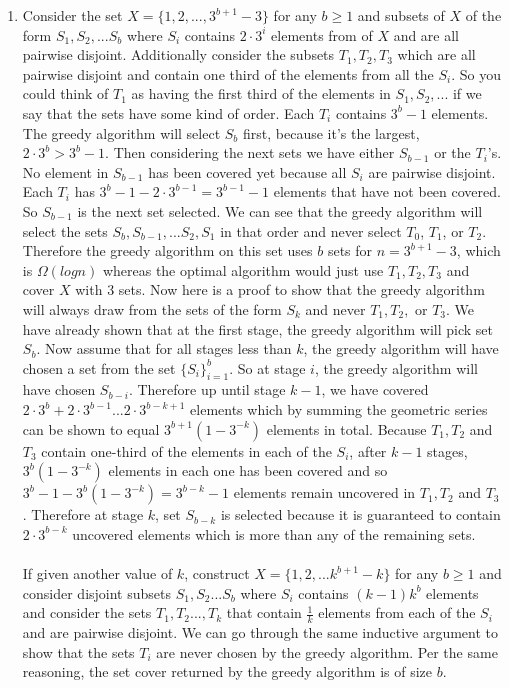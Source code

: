 \documentclass{article}
\begin{document}
\begin{enumerate}
	\item Consider the set $X = \{1, 2, ..., 3^{b+1}-3\}$ for any $b \geq 1$ and subsets of $X$ of the form $S_1, S_2, ... S_b$ where $S_i$ contains $2\cdot 3^i$ elements from of $X$ and are all pairwise disjoint.  Additionally consider the subsets $T_1,T_2,T_3$ which are all pairwise disjoint and contain one third of the elements from all the $S_i$.  So you could think of $T_1$ as having the first third of the elements in $S_1, S_2, ... $ if we say that the sets have some kind of order.  Each $T_i$ contains $3^b-1$ elements.  The greedy algorithm will select $S_b$ first, because it's the largest, $2\cdot 3^b > 3^b - 1$.  Then considering the next sets we have either $S_{b-1}$ or the $T_i$'s.  No element in $S_{b-1}$ has been covered yet because all $S_i$ are pairwise disjoint.  Each $T_i$ has $3^b - 1 - 2\cdot 3^{b-1} = 3^{b-1} - 1$ elements that have not been covered.  So $S_{b-1}$ is the next set selected.  We can see that the greedy algorithm will select the sets $S_b, S_{b-1}, ... S_2, S_1$ in that order and never select $T_0$, $T_1$, or $T_2$.  Therefore the greedy algorithm on this set uses $b$ sets for $n = 3^{b+1}-3$, which is $\Omega(logn)$ whereas the optimal algorithm would just use $T_1,T_2,T_3$ and cover $X$ with 3 sets.  Now here is a proof to show that the greedy algorithm will always draw from the sets of the form $S_k$ and never $T_1,T_2,$ or $T_3$.  We have already shown that at the first stage, the greedy algorithm will pick set $S_b$.  Now assume that for all stages less than $k$, the greedy algorithm will have chosen a set from the set $\{S_i\}_{i=1}^b$.  So at stage $i$, the greedy algorithm will have chosen $S_{b-i}$.  Therefore up until stage $k-1$, we have covered $2\cdot 3^b + 2\cdot 3^{b-1} ... 2\cdot 3^{b-k+1}$ elements which by summing the geometric series can be shown to equal $3^{b+1}(1-3^{-k})$ elements in total.  Because $T_1,T_2$ and $T_3$ contain one-third of the elements in each of the $S_i$, after $k-1$ stages, $3^{b}(1-3^{-k})$ elements in each one has been covered and so $3^b-1-3^{b}(1-3^{-k}) = 3^{b-k}-1$ elements remain uncovered in $T_1,T_2$ and $T_3$. Therefore at stage $k$, set $S_{b-k}$ is selected because it is guaranteed to contain $2\cdot3^{b-k}$ uncovered elements which is more than any of the remaining sets.  \\
	\\
	If given another value of $k$, construct $X = \{1, 2, ... k^{b+1}-k\}$ for any $b \geq 1$ and consider disjoint subsets $S_1, S_2 ... S_b$ where $S_i$ contains $(k-1)k^b$ elements and consider the sets $T_1, T_2...,T_k$ that contain $\frac{1}{k}$ elements from each of the $S_i$ and are pairwise disjoint.  We can go through the same inductive argument to show that the sets $T_i$ are never chosen by the greedy algorithm.  Per the same reasoning, the set cover returned by the greedy algorithm is of size $b$.  
	

\end{enumerate}
\end{document}
